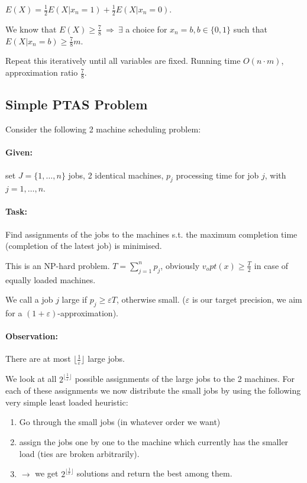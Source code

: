 \documentclass[11pt]{article}
\theoremstyle{definition}
\theoremstyle{definition}
\begin{document}
$ E(X) = \frac{1}{2} E(X | x_n = 1) + \frac{1}{2} E(X | x_n = 0) $.

We know that $ E(X) \geq \frac{7}{8} ~ \Rightarrow ~ \exists $ a choice for $ x_n = b, b \in \{0, 1\} $ such that $ E(X | x_n = b) \geq \frac{7}{8} m $.

Repeat this iteratively until all variables are fixed. Running time $ O(n \cdot m ) $, approximation ratio $ \frac{7}{8} $.

\subsection{Simple PTAS Problem}

Consider the following 2 machine scheduling problem:

\paragraph{Given:} set $ J = \{1, \dots, n \} $ jobs, 2 identical machines, $ p_j $ processing time for job $ j $, with $ j = 1, \dots, n $.

\paragraph{Task:} Find assignments of the jobs to the machines s.t. the maximum completion time (completion of the latest job) is minimised.

This is an NP-hard problem. $ T = \sum \limits_{j = 1}^n p_j $, obviously $ v_opt(x) \geq \frac{T}{2}  $ in case of equally loaded machines.

We call a job $ j $ large if $ p_j \geq \varepsilon T $, otherwise small. ($ \varepsilon $ is our target precision, we aim for a $( 1 + \varepsilon) $-approximation).

\paragraph{Observation:} There are at most $ \lfloor \frac{1}{\varepsilon} \rfloor $ large jobs.

We look at all $ 2^{ \lfloor \frac{1}{\varepsilon} \rfloor} $ possible assignments of the large jobs to the 2 machines. For each of these assignments we now distribute the small jobs by using the following very simple least loaded heuristic:

\begin{enumerate}
\item Go through the small jobs (in whatever order we want)
\item assign the jobs one by one to the machine which currently has the smaller load (ties are broken arbitrarily).
\item $ \rightarrow $ we get $ 2^{ \lfloor \frac{1}{\varepsilon} \rfloor} $ solutions and return the best among them.
\end{enumerate}
\end{document}
